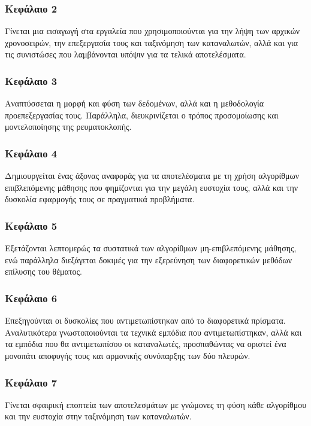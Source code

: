 \subsubsection{Κεφάλαιο 2}
Γίνεται μια εισαγωγή στα εργαλεία που χρησιμοποιούνται για την λήψη των αρχικών χρονοσειρών, την επεξεργασία τους και ταξινόμηση των καταναλωτών, αλλά και για τις συνιστώσες που λαμβάνονται υπόψιν για τα τελικά αποτελέσματα.
\subsubsection{Κεφάλαιο 3}
Αναπτύσσεται η μορφή και φύση των δεδομένων, αλλά και η μεθοδολογία προεπεξεργασίας τους. Παράλληλα, διευκρινίζεται ο τρόπος προσομοίωσης και μοντελοποίησης της ρευματοκλοπής.
\subsubsection{Κεφάλαιο 4}
Δημιουργείται ένας άξονας αναφοράς για τα αποτελέσματα με τη χρήση αλγορίθμων επιβλεπόμενης μάθησης που φημίζονται για την μεγάλη ευστοχία τους, αλλά και την δυσκολία εφαρμογής τους σε πραγματικά προβλήματα.
\subsubsection{Κεφάλαιο 5}
Εξετάζονται λεπτομερώς τα συστατικά των αλγορίθμων μη-επιβλεπόμενης μάθησης, ενώ παράλληλα διεξάγεται δοκιμές για την εξερεύνηση των διαφορετικών μεθόδων επίλυσης του θέματος.
\subsubsection{Κεφάλαιο 6}
Επεξηγούνται οι δυσκολίες που αντιμετωπίστηκαν από το διαφορετικά πρίσματα. Αναλυτικότερα γνωστοποιούνται τα τεχνικά εμπόδια που αντιμετωπίστηκαν, αλλά και τα εμπόδια που θα αντιμετωπίσου οι καταναλωτές, προσπαθώντας να οριστεί ένα μονοπάτι αποφυγής τους και αρμονικής συνύπαρξης των δύο πλευρών.
\subsubsection{Κεφάλαιο 7}
Γίνεται σφαιρική εποπτεία των αποτελεσμάτων με γνώμονες τη φύση κάθε αλγορίθμου και την ευστοχία στην ταξινόμηση των καταναλωτών.